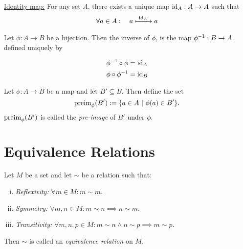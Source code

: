 
\noindent \uline{Identity map:} For any set \(A\), there exists a unique map \(\operatorname{id}_A: A \to A\) such that
\begin{align*}
	\forall a \in A: \quad a \xmapsto{\ \operatorname{id}_A\ } a
\end{align*}

\begin{definition}
	Let \(\phi: A \to B\) be a bijection. Then the inverse of \(\phi\), is the map \(\phi^{-1}: B \to A\) defined uniquely by
	\begin{minipage}{0.4\textwidth}
		\begin{figure}[H]
			\centering
			\label{fig:inverse_of_map}
		\end{figure}
	\end{minipage}\hfill
	\begin{minipage}{0.6\textwidth}
		\begin{equation}
			\begin{aligned}
				\phi^{-1} \circ \phi & = \operatorname{id}_A \\
				\phi \circ \phi^{-1} & = \operatorname{id}_B
			\end{aligned}
		\end{equation}
	\end{minipage}
\end{definition}

\begin{definition}
	Let \(\phi: A \to B\) be a map and let \(B' \subseteq B\). Then define the set
	\begin{equation}
		\operatorname{preim}_{\phi}(B') := \qty{a \in A \ \middle|\ \phi(a) \in B'}.
	\end{equation}
	\(\operatorname{preim}_{\phi}(B')\) is called the \emph{pre-image} of \(B'\) under \(\phi\).
\end{definition}

\section{Equivalence Relations}

\begin{definition}
	Let \(M\) be a set and let \(\sim\) be a relation such that:
	\begin{enumerate}[(i)]
		\item \emph{Reflexivity:} \(\forall m \in M: m \sim m\).
		\item \emph{Symmetry:} \(\forall m, n \in M: m \sim n \implies n \sim m\).
		\item \emph{Transitivity:} \(\forall m, n, p \in M: m \sim n \land n \sim p \implies m \sim p\).
	\end{enumerate}
	Then \(\sim\) is called an \emph{equivalence relation} on \(M\).
\end{definition}

